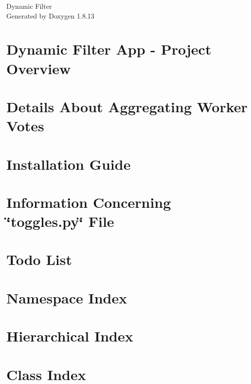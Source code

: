 \documentclass[twoside]{book}
\newcommand{\+}{\discretionary{\mbox{\scriptsize$\hookleftarrow$}}{}{}}
\newcommand{\clearemptydoublepage}{%
  \newpage{\pagestyle{empty}\cleardoublepage}%
}
\begin{document}
\hypersetup{pageanchor=false,
             bookmarksnumbered=true,
             pdfencoding=unicode
            }
\begin{titlepage}
\vspace*{7cm}
\begin{center}%
{\Large Dynamic Filter }\\
\vspace*{1cm}
{\large Generated by Doxygen 1.8.13}\\
\end{center}
\end{titlepage}
\clearemptydoublepage
{}
\tableofcontents
\clearemptydoublepage
{}
\hypersetup{pageanchor=true}

\chapter{Dynamic Filter App -\/ Project Overview}
\label{index}\hypertarget{index}{}
\chapter{Details About Aggregating Worker Votes}
\label{con_info}

\chapter{Installation Guide}
\label{install_info}

\chapter{Information Concerning \char`\"{}toggles.\+py\char`\"{} File}
\label{toggles}

\chapter{Todo List}
\label{todo}

\chapter{Namespace Index}

\chapter{Hierarchical Index}

\chapter{Class Index}

\end{document}
